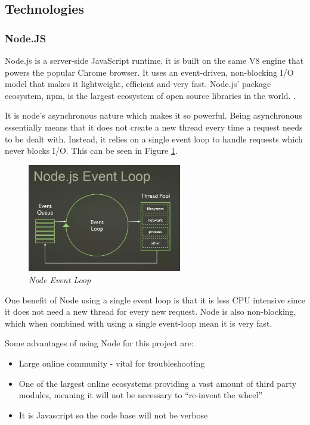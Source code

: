 \documentclass{article}
\begin{document}
\subsection{Technologies}
\subsubsection{Node.JS}
Node.js is a server-side JavaScript runtime, it is built on the same V8 engine that powers the popular Chrome browser. It uses an event-driven, non-blocking I/O model that makes it lightweight, efficient and very fast. Node.js' package ecosystem, npm, is the largest ecosystem of open source libraries in the world. \citep{Nodejs.org2016}.

It is node's asynchronous nature which makes it so powerful. Being asynchronous essentially means that it does not create a new thread every time a request needs to be dealt with. Instead, it relies on a single event loop to handle requests which never blocks I/O. This can be seen in Figure \ref{fig:event_loop}.

\begin{figure}[!h]
\centering
\includegraphics*[width=0.6\textwidth]{images/event_loop}
\caption{\em Node Event Loop}
\label{fig:event_loop}
\end{figure}

One benefit of Node using a single event loop is that it is less CPU intensive since it does not need a new thread for every new request. Node is also non-blocking, which when combined with using a single event-loop mean it is very fast.

Some advantages of using Node for this project are:

\begin{itemize}
  \item Large online community - vital for troubleshooting
  \item One of the largest online ecosystems providing a vast amount of third party modules, meaning it will not be necessary to ``re-invent the wheel''
  \item It is Javascript so the code base will not be verbose
\end{itemize}
\end{document}
